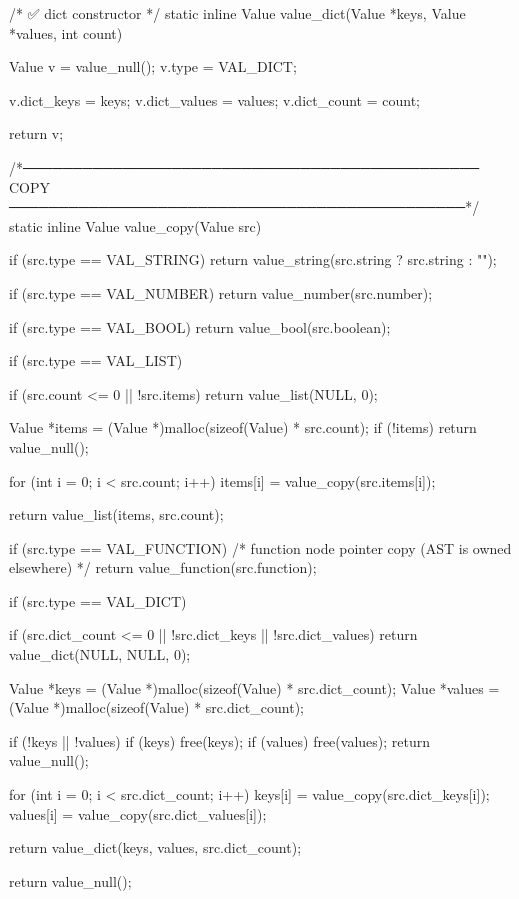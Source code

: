 \documentclass{article}
\begin{document}
/* ✅ dict constructor */
static inline Value value_dict(Value *keys, Value *values, int count)
{
    Value v = value_null();
    v.type = VAL_DICT;

    v.dict_keys = keys;
    v.dict_values = values;
    v.dict_count = count;

    return v;
}

/*──────────────────────────────────────────────
  COPY
──────────────────────────────────────────────*/
static inline Value value_copy(Value src)
{
    if (src.type == VAL_STRING) {
        return value_string(src.string ? src.string : "");
    }

    if (src.type == VAL_NUMBER) {
        return value_number(src.number);
    }

    if (src.type == VAL_BOOL) {
         return value_bool(src.boolean);
    }


    if (src.type == VAL_LIST) {

        if (src.count <= 0 || !src.items) {
            return value_list(NULL, 0);
        }

        Value *items = (Value *)malloc(sizeof(Value) * src.count);
        if (!items) return value_null();

        for (int i = 0; i < src.count; i++) {
            items[i] = value_copy(src.items[i]);
        }

        return value_list(items, src.count);
    }

    if (src.type == VAL_FUNCTION) {
        /* function node pointer copy (AST is owned elsewhere) */
        return value_function(src.function);
    }

    if (src.type == VAL_DICT) {

        if (src.dict_count <= 0 || !src.dict_keys || !src.dict_values) {
            return value_dict(NULL, NULL, 0);
        }

        Value *keys = (Value *)malloc(sizeof(Value) * src.dict_count);
        Value *values = (Value *)malloc(sizeof(Value) * src.dict_count);

        if (!keys || !values) {
            if (keys) free(keys);
            if (values) free(values);
            return value_null();
        }

        for (int i = 0; i < src.dict_count; i++) {
            keys[i] = value_copy(src.dict_keys[i]);
            values[i] = value_copy(src.dict_values[i]);
        }

        return value_dict(keys, values, src.dict_count);
    }

    return value_null();
}
\end{document}
